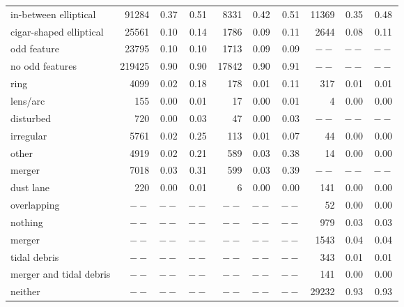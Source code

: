 \documentclass[iop,apj,tighten]{emulateapj}
\begin{document}
\begin{table*}
\begin{tabular}{l|rcc|rcc|rcc}
    in-between elliptical   &  91284 & 0.37    & 0.51    &   8331 & 0.42    & 0.51    & 11369 & 0.35    & 0.48 \\
    cigar-shaped elliptical &  25561 & 0.10    & 0.14    &   1786 & 0.09    & 0.11    &  2644 & 0.08    & 0.11 \\
    \hline                                                                            
    odd feature             &  23795 & 0.10    & 0.10    &   1713 & 0.09    & 0.09    &  $--$ & $--$    & $--$ \\
    no odd features         & 219425 & 0.90    & 0.90    &  17842 & 0.90    & 0.91    &  $--$ & $--$    & $--$ \\
    \hline                                                                            
    ring                    &   4099 & 0.02    & 0.18    &    178 & 0.01    & 0.11    &   317 & 0.01    & 0.01 \\
    lens/arc                &    155 & 0.00    & 0.01    &     17 & 0.00    & 0.01    &     4 & 0.00    & 0.00    \\
    disturbed               &    720 & 0.00    & 0.03    &     47 & 0.00    & 0.03    &  $--$ & $--$    & $--$ \\
    irregular               &   5761 & 0.02    & 0.25    &    113 & 0.01    & 0.07    &    44 & 0.00    & 0.00    \\
    other                   &   4919 & 0.02    & 0.21    &    589 & 0.03    & 0.38    &    14 & 0.00    & 0.00    \\
    merger                  &   7018 & 0.03    & 0.31    &    599 & 0.03    & 0.39    &  $--$ & $--$    & $--$ \\
    dust lane               &    220 & 0.00    & 0.01    &      6 & 0.00    & 0.00    &   141 & 0.00    & 0.00    \\
    overlapping             &   $--$ & $--$    & $--$    &   $--$ & $--$    & $--$    &    52 & 0.00    & 0.00    \\
    nothing                 &   $--$ & $--$    & $--$    &   $--$ & $--$    & $--$    &   979 & 0.03    & 0.03 \\
    \hline
    merger                  & $--$ & $--$ & $--$ & $--$ & $--$ & $--$ &  1543 & 0.04 & 0.04 \\
    tidal debris            & $--$ & $--$ & $--$ & $--$ & $--$ & $--$ &   343 & 0.01 & 0.01 \\
    merger and tidal debris & $--$ & $--$ & $--$ & $--$ & $--$ & $--$ &   141 & 0.00    & 0.00    \\
    neither                 & $--$ & $--$ & $--$ & $--$ & $--$ & $--$ & 29232 & 0.93 & 0.93 \\
\hline\hline
\end{tabular}
\end{table*}
\end{document}
